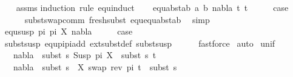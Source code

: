 \begin{isabellebody}
%
\isadelimproof
\ \ %
\endisadelimproof
%
\isatagproof
{}\isamarkupfalse%
\ assms\isanewline
{}\isamarkupfalse%
{\isacharparenleft}{\kern0pt}induction\ rule{\isacharcolon}{\kern0pt}\ equ{\isachardot}{\kern0pt}induct{\isacharparenright}{\kern0pt}\isanewline
\ \ \isamarkupfalse%
\ {\isacharparenleft}{\kern0pt}equ{\isacharunderscore}{\kern0pt}abst{\isacharunderscore}{\kern0pt}ab\ a\ b\ nabla\ t{}\ t{}{\isacharparenright}{\kern0pt}\isanewline
\ \ \isamarkupfalse%
\ \isamarkupfalse%
\ {\isacharquery}{\kern0pt}case\ \isanewline
\ \ \ \ \isamarkupfalse%
\ subst{\isacharunderscore}{\kern0pt}swap{\isacharunderscore}{\kern0pt}comm\ fresh{\isacharunderscore}{\kern0pt}subst\ equ{\isachardot}{\kern0pt}equ{\isacharunderscore}{\kern0pt}abst{\isacharunderscore}{\kern0pt}ab\ \isamarkupfalse%
\ simp\ \isanewline
{}\isamarkupfalse%
\isanewline
\ \ \isamarkupfalse%
\ {\isacharparenleft}{\kern0pt}equ{\isacharunderscore}{\kern0pt}susp\ pi{}\ pi{}\ X\ nabla{\isacharparenright}{\kern0pt}\isanewline
\ \ \isamarkupfalse%
\ \isamarkupfalse%
\ {\isacharquery}{\kern0pt}case\ \isanewline
\ \ \ \ \isamarkupfalse%
\ subst{\isacharunderscore}{\kern0pt}susp\ equ{\isacharunderscore}{\kern0pt}pi{}{\isacharunderscore}{\kern0pt}pi{}{\isacharunderscore}{\kern0pt}add\ ext{\isacharunderscore}{\kern0pt}subst{\isacharunderscore}{\kern0pt}def\ subst{\isacharunderscore}{\kern0pt}susp\isanewline
\ \ \ \ \isamarkupfalse%
\ fastforce\isanewline
{}\isamarkupfalse%
\ {\isacharparenleft}{\kern0pt}auto{\isacharparenright}{\kern0pt}%
\endisatagproof
{\isafoldproof}%
%
\isadelimproof
\isanewline
%
\endisadelimproof
\isanewline
{}\isamarkupfalse%
\ unif{\isacharunderscore}{\kern0pt}{}{\isacharcolon}{\kern0pt}\ \isanewline
\ \ \ {\isachardoublequoteopen}nabla\ {\isasymturnstile}\ subst\ s\ {\isacharparenleft}{\kern0pt}Susp\ pi\ X{\isacharparenright}{\kern0pt}\ {\isasymapprox}\ subst\ s\ t{\isachardoublequoteclose}\isanewline
\ \ \ {\isachardoublequoteopen}nabla\ {\isasymTurnstile}\ subst\ {\isacharparenleft}{\kern0pt}s\ {\isasymbullet}\ {\isacharbrackleft}{\kern0pt}{\isacharparenleft}{\kern0pt}X{\isacharcomma}{\kern0pt}\ swap\ {\isacharparenleft}{\kern0pt}rev\ pi{\isacharparenright}{\kern0pt}\ t{\isacharparenright}{\kern0pt}{\isacharbrackright}{\kern0pt}{\isacharparenright}{\kern0pt}\ {\isasymapprox}\ subst\ s{\isachardoublequoteclose}\isanewline

\end{isabellebody}
